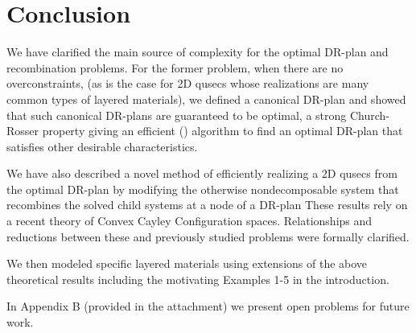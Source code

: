 \section{Conclusion}
% 

We have clarified the main source of complexity for the optimal DR-plan and recombination problems. For the former problem, when there are no overconstraints, (as is the case for 2D qusecs whose realizations are many common types of layered materials), we defined a canonical DR-plan and showed that such canonical DR-plans are guaranteed to be optimal, a strong Church-Rosser property giving an efficient (\candrpcomplexity) algorithm to find an optimal  DR-plan that satisfies other desirable characteristics.

We have also described a novel method of efficiently realizing a 2D qusecs from the optimal DR-plan by modifying the otherwise nondecomposable system that recombines the solved child systems at a node of a DR-plan These results rely on a recent theory of Convex Cayley Configuration spaces. Relationships and reductions between these and previously studied problems were formally clarified.

We then modeled specific layered materials using extensions of the above theoretical results including the motivating Examples 1-5 in the introduction.

In Appendix B (provided in the attachment) we present open problems for future work.
